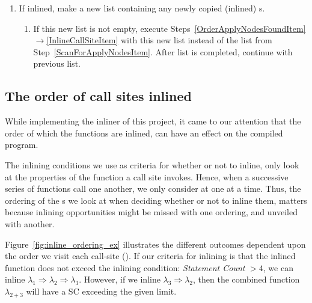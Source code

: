 \begin{enumerate}
\begin{enumerate}
		\item If inlined, make a new list containing any newly copied (inlined)
\applyNode s.
		\label{InlineCallSiteItem}

		\begin{enumerate}
			\item If this new list is not empty, execute
Steps~\ref{OrderApplyNodesFoundItem}$\rightarrow$\ref{InlineCallSiteItem} with
this new list instead of the list from Step~\ref{ScanForApplyNodesItem}. After
list is completed, continue with previous list.
			\label{InlineNewListItem}
		\end{enumerate}

	\end{enumerate}
\end{enumerate}

\subsection{The order of call sites inlined}
\label{sub:scheme:ordering_apply_nodes}


While implementing the inliner of this project, it came to our attention that
the order of which the functions are inlined, can have an effect on the
compiled program.

The inlining conditions we use as criteria for whether or not to inline, only
look at the properties of the function a call site invokes. Hence, when a
successive series of functions call one another, we only consider at one at a
time. Thus, the ordering of the \applyNode s we look at when deciding whether or
not to inline them, matters because inlining opportunities might be missed with
one ordering, and unveiled with another.

Figure~\ref{fig:inline_ordering_ex} illustrates the different outcomes dependent
upon the order we visit each call-site (\applyNode ). If our criteria for inlining
is that the inlined function does not exceed the inlining condition:
\textit{Statement Count} $> 4$, we can inline $\lambda_1 \Rightarrow \lambda_2
\Rightarrow \lambda_3$. However, if we inline $\lambda_3 \Rightarrow \lambda_2$,
then the combined function $\lambda_{2+3}$ will have a SC exceeding the given
limit.

